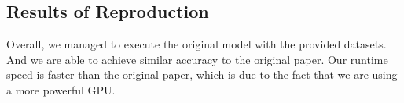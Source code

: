 \documentclass[11pt,a4paper]{article}
\begin{document}




\subsection{Results of Reproduction}



Overall, we managed to execute the original model with the provided datasets. And we are able to achieve similar accuracy to the original paper. Our runtime speed is faster than the original paper, which is due to the fact that we are using a more powerful GPU.

\end{document}
